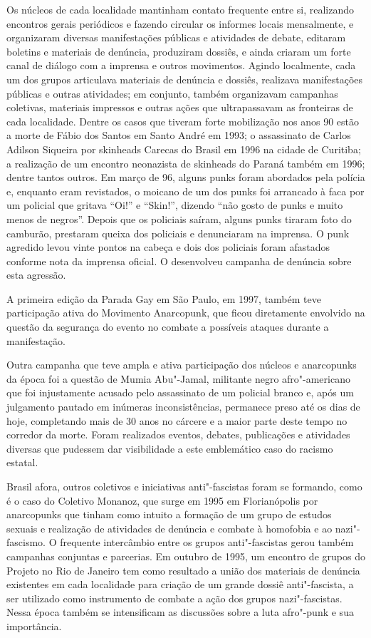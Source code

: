 Os núcleos  de cada localidade mantinham contato frequente entre si, realizando encontros gerais periódicos e fazendo circular os informes locais mensalmente, e organizaram diversas manifestações públicas e atividades de debate, editaram boletins e materiais de denúncia, produziram dossiês, e ainda criaram um forte canal de diálogo com a imprensa e outros movimentos. Agindo localmente, cada um dos grupos articulava materiais de denúncia e dossiês, realizava manifestações públicas e outras atividades; em conjunto, também organizavam campanhas coletivas, materiais impressos e outras ações que ultrapassavam as fronteiras de cada localidade. Dentre os casos que tiveram forte mobilização nos anos 90 estão a morte de Fábio dos Santos em Santo André em 1993; o assassinato de Carlos Adilson Siqueira por skinheads Carecas do Brasil em 1996 na cidade de Curitiba; a realização de um encontro neonazista de skinheads do Paraná também em 1996; dentre tantos outros. Em março de 96, alguns punks foram abordados pela polícia e, enquanto eram revistados, o moicano de um dos punks foi arrancado à faca por um policial que gritava ``Oi!'' e ``Skin!'', dizendo ``não gosto de punks e muito menos de negros''. Depois que os policiais saíram, alguns punks tiraram foto do camburão, prestaram queixa dos policiais e denunciaram na imprensa. O punk agredido levou vinte pontos na cabeça e dois dos policiais foram afastados conforme nota da imprensa oficial. O  desenvolveu campanha de denúncia sobre esta agressão.

A primeira edição da Parada Gay em São Paulo, em 1997, também teve participação ativa do Movimento Anarcopunk, que ficou diretamente envolvido na questão da segurança do evento no combate a possíveis ataques durante a manifestação.

Outra campanha que teve ampla e ativa participação dos núcleos  e anarcopunks da época foi a questão de Mumia Abu"-Jamal, militante negro afro"-americano que foi injustamente acusado pelo assassinato de um policial branco e, após um julgamento pautado em inúmeras inconsistências, permanece preso até os dias de hoje, completando mais de 30 anos no cárcere e a maior parte deste tempo no corredor da morte. Foram realizados eventos, debates, publicações e atividades diversas que pudessem dar visibilidade a este emblemático caso do racismo estatal.

Brasil afora, outros coletivos e iniciativas anti"-fascistas foram se formando, como é o caso do Coletivo Monanoz, que surge em 1995 em Florianópolis por anarcopunks que tinham como intuito a formação de um grupo de estudos sexuais e realização de atividades de denúncia e combate à homofobia e ao nazi"-fascismo. O frequente intercâmbio entre os grupos anti"-fascistas gerou também campanhas conjuntas e parcerias. Em outubro de 1995, um encontro de grupos do Projeto  no Rio de Janeiro tem como resultado a união dos materiais de denúncia existentes em cada localidade para criação de um grande dossiê anti"-fascista, a ser utilizado como instrumento de combate a ação dos grupos nazi"-fascistas. Nessa época também se intensificam as discussões sobre a luta afro"-punk e sua importância.


